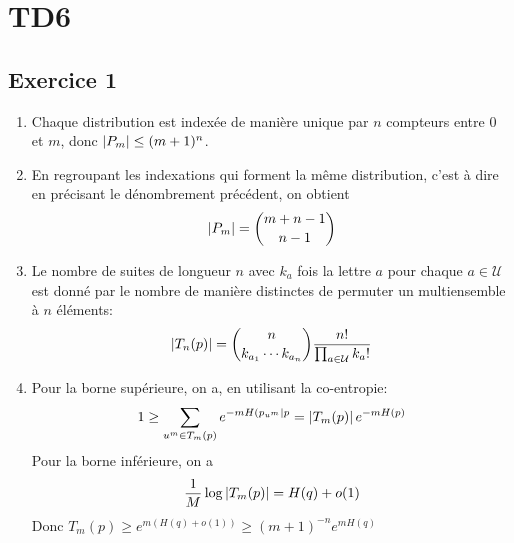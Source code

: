 \documentclass{cours}
\begin{document}
\section{TD6}
\subsection{Exercice 1}
\begin{enumerate}
	\item Chaque distribution est indexée de manière unique par $n$ compteurs entre $0$ et $m$, donc $\left|P_{m}\right| \leq (m + 1)^{n}$.
	\item En regroupant les indexations qui forment la même distribution, c'est à dire en précisant le dénombrement précédent, on obtient
		\begin{equation*}
			\left|P_{m}\right| = \binom{m + n - 1}{n - 1}
		\end{equation*}
	\item Le nombre de suites de longueur $n$ avec $k_{a}$ fois la lettre $a$ pour chaque $a \in \mathcal{U}$ est donné par le nombre de manière distinctes de permuter un multiensemble à $n$ éléments: 
		\begin{equation*}
			\left|T_{n}(p)\right| = \binom{n}{k_{a_{1}}\cdots k_{a_{n}}}\frac{n!}{\prod_{a \in \mathcal{U}} k_{a}!}
		\end{equation*}
	\item Pour la borne supérieure, on a, en utilisant la co-entropie:
		\begin{equation*}
			1 \geq \sum_{u^{m} \in T_{m}(p)} e^{-m H(p_{u^{m}}\mid p} = \left|T_{m}(p)\right|e^{-mH(p)}
		\end{equation*}
		Pour la borne inférieure, on a 
		\begin{equation*}
			\frac{1}{M} \log \left|T_{m}(p)\right| = H(q) + o(1)
		\end{equation*}
		Donc $T_{m}(p) \geq e^{m(H(q) + o(1))} \geq (m + 1)^{-n}e^{mH(q)}$
\end{enumerate}
\end{document}
